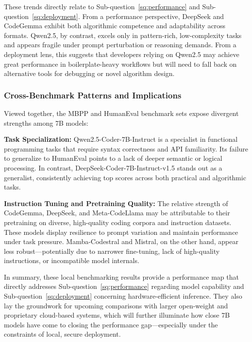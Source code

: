 These trends directly relate to Sub-question~\ref{sq:performance} and Sub-question~\ref{sq:deployment}. From a performance perspective, DeepSeek and CodeGemma exhibit both algorithmic competence and adaptability across formats. Qwen2.5, by contrast, excels only in pattern-rich, low-complexity tasks and appears fragile under prompt perturbation or reasoning demands. From a deployment lens, this suggests that developers relying on Qwen2.5 may achieve great performance in boilerplate-heavy workflows but will need to fall back on alternative tools for debugging or novel algorithm design.

\subsubsection*{Cross-Benchmark Patterns and Implications}

Viewed together, the MBPP and HumanEval benchmark sets expose divergent strengths among 7B models:

\textbf{Task Specialization:} Qwen2.5-Coder-7B-Instruct is a specialist in functional programming tasks that require syntax correctness and API familiarity. Its failure to generalize to HumanEval points to a lack of deeper semantic or logical processing. In contrast, DeepSeek-Coder-7B-Instruct-v1.5 stands out as a generalist, consistently achieving top scores across both practical and algorithmic tasks.

\textbf{Instruction Tuning and Pretraining Quality:} The relative strength of CodeGemma, DeepSeek, and Meta-CodeLlama may be attributable to their pretraining on diverse, high-quality coding corpora and instruction datasets. These models display resilience to prompt variation and maintain performance under task pressure. Mamba-Codestral and Mistral, on the other hand, appear less robust—potentially due to narrower fine-tuning, lack of high-quality instructions, or incompatible model internals.

In summary, these local benchmarking results provide a performance map that directly addresses Sub-question~\ref{sq:performance} regarding model capability and Sub-question~\ref{sq:deployment} concerning hardware-efficient inference. They also lay the groundwork for upcoming comparisons with larger open-weight and proprietary cloud-based systems, which will further illuminate how close 7B models have come to closing the performance gap—especially under the constraints of local, secure deployment.


